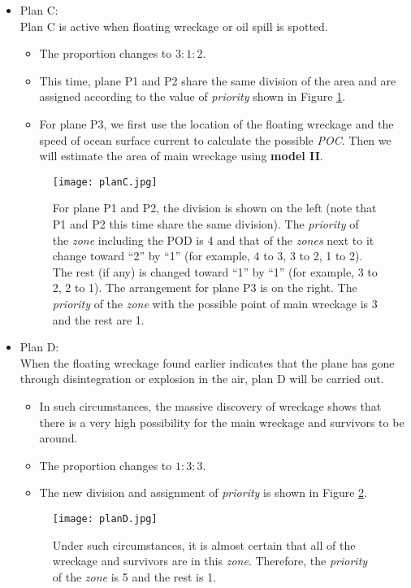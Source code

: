 \documentclass[a4paper,11pt]{article}
\begin{document}
\begin{spacing}{1.0}
\begin{itemize}
	\item Plan C: 
	\\Plan C is active when floating wreckage or oil spill is spotted.
	\begin{itemize}
		\item The proportion changes to $3:1:2$.
		\item This time, plane P1 and P2 share the same division of the area and are assigned according to the value of \textit{priority} shown in Figure \ref{planC}.
		\item For plane P3, we first use the location of the floating wreckage and the speed of ocean surface current to calculate the possible  \textit{POC}. Then we will estimate the area of main wreckage using \textbf{model II}.
	\end{itemize}
	\begin{figure}[H]
		\centering
		\texttt{[image: planC.jpg]}
		\caption{For plane P1 and P2, the division is shown on the left (note that P1 and P2 this time share the same division). The \textit{priority} of the \textit{zone} including the POD is 4 and that of the \textit{zones} next to it change toward ``2'' by ``1'' (for example, 4 to 3, 3 to 2, 1 to 2). The rest (if any) is changed toward ``1'' by ``1'' (for example, 3 to 2, 2 to 1). The arrangement for  plane P3 is on the right. The \textit{priority} of the \textit{zone} with the possible point of main wreckage is 3 and the rest are 1.}\label{planC}
	\end{figure}
	
	
	\item Plan D: 
	\\When the floating wreckage found earlier indicates that the plane has gone through disintegration or explosion in the air, plan D will be carried out.
	\begin{itemize}
		\item In such circumstances, the massive discovery of wreckage shows that there is a very high possibility for the main wreckage and survivors to be around.
		\item The proportion changes to $1:3:3$.
		\item The new division and assignment of \textit{priority} is shown in Figure \ref{planD}.
	\end{itemize}
	\begin{figure}[H]
		\centering
		\texttt{[image: planD.jpg]}
		\caption{Under such circumstances, it is almost certain that all of the wreckage and survivors are in this \textit{zone}. Therefore, the \textit{priority} of the \textit{zone} is 5 and the rest is 1.}\label{planD}
	\end{figure}
	

\end{itemize}
\end{spacing}
\end{document}
